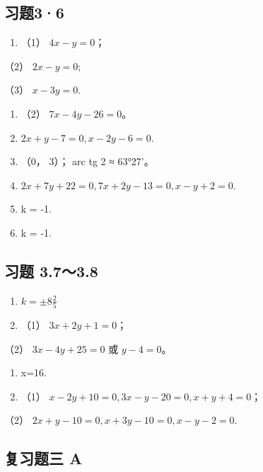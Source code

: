 \subsection{习题3·6}\label{ux4e60ux989836}

\begin{enumerate}
\def\labelenumi{\arabic{enumi}.}
\tightlist
\item
  （1） \(4x - y = 0\)；
\end{enumerate}

（2） \(2x - y = 0;\)

（3） \(x - 3y = 0.\)

\begin{enumerate}
\def\labelenumi{\arabic{enumi}.}
\setcounter{enumi}{1}
\item
  （2） \(7x - 4y - 26 = 0\)。
\item
  \(2x + y - 7 = 0, x - 2y - 6 = 0.\)
\item
  （0， 3）； arc tg 2 ≈ 63°27'。
\item
  \(2x + 7y + 22 = 0, 7x + 2y - 13 = 0, x - y + 2 = 0.\)
\item
  k = -1.
\item
  k = -1.
\end{enumerate}

\subsection{习题 3.7～3.8}\label{ux4e60ux9898-3.73.8}

\begin{enumerate}
\def\labelenumi{\arabic{enumi}.}
\setcounter{enumi}{2}
\item
  \(k = \pm 8\frac{2}{5}\)
\item
  （1） \(3x + 2y + 1 = 0\)；
\end{enumerate}

（2） \(3x - 4y + 25 = 0\) 或 \(y - 4 = 0\)。

\begin{enumerate}
\def\labelenumi{\arabic{enumi}.}
\setcounter{enumi}{4}
\item
  x=16.
\item
  （1） \(x - 2y + 10 = 0, 3x - y - 20 = 0, x + y + 4 = 0\)；
\end{enumerate}

（2） \(2x + y - 10 = 0, x + 3y - 10 = 0, x - y - 2 = 0.\)

\subsection{复习题三 A}\label{ux590dux4e60ux9898ux4e09-a-1}

